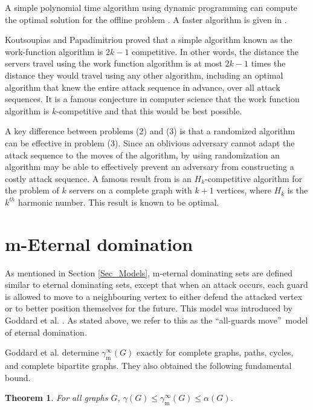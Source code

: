 \documentclass[12pt]{article}%
\newtheorem{theorem}{Theorem}[section]
\begin{document}
A simple polynomial time algorithm using dynamic programming can compute the
optimal solution for the offline problem \cite{mms}. A faster algorithm is
given in \cite{ckpv}.

Koutsoupias and Papadimitriou \cite{kout} proved that a simple algorithm known
as the work-function algorithm is $2k-1$ competitive. In other words, the
distance the servers travel using the work function algorithm is at most
$2k-1$ times the distance they would travel using any other algorithm,
including an optimal algorithm that knew the entire attack sequence in
advance, over all attack sequences. It is a famous conjecture in computer
science that the work function algorithm is $k$-competitive and that this
would be best possible.

A key difference between problems (2) and (3) is that a randomized algorithm
can be effective in problem (3). Since an oblivious adversary cannot adapt the
attack sequence to the moves of the algorithm, by using randomization an
algorithm may be able to effectively prevent an adversary from constructing a
costly attack sequence. A famous result from \cite{ms} is an $H_{k}%
$-competitive algorithm for the problem of $k$ servers on a complete graph
with $k+1$ vertices, where $H_{k}$ is the $k^{th}$ harmonic number. This
result is known to be optimal.

\section{m-Eternal domination}

\label{Sec_mED}

As mentioned in Section \ref{Sec_Models}, m-eternal dominating sets are
defined similar to eternal dominating sets, except that when an attack occurs,
each guard is allowed to move to a neighbouring vertex to either defend the
attacked vertex or to better position themselves for the future. This model
was introduced by Goddard et al. \cite{GHH}. As stated above, we refer to this
as the \textquotedblleft all-guards move\textquotedblright\ model of eternal domination.

Goddard et al. \cite{GHH} determine $\gamma_{\mathrm{m}}^{\infty}(G)$ exactly
for complete graphs, paths, cycles, and complete bipartite graphs. They also
obtained the following fundamental bound.

\begin{theorem}
\label{GHH1} \emph{\cite{GHH}}\hspace{0.1in}For all graphs $G$, $\gamma
(G)\leq\gamma_{\mathrm{m}}^{\infty}(G)\leq\alpha(G)$.
\end{theorem}
\end{document}
